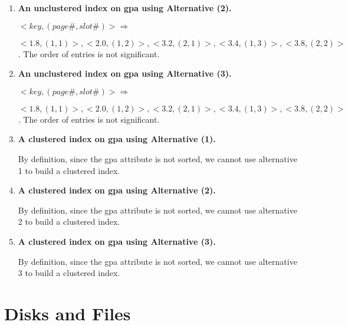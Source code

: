 \begin{enumerate}
\item {\bf An unclustered index on gpa using Alternative (2). }

$<key, (page \#, slot \#)> \Rightarrow$

$<1.8, (1, 1)>, <2.0, (1, 2)>, <3.2, (2, 1)>, <3.4, (1, 3)>, <3.8, (2, 2)>$. The order of entries is not significant.

\item {\bf An unclustered index on gpa using Alternative (3). }

$<key, (page \#, slot \#)> \Rightarrow$

$<1.8, (1, 1)>, <2.0, (1, 2)>, <3.2, (2, 1)>, <3.4, (1, 3)>, <3.8, (2, 2)>$. The order of entries is not significant.

\item {\bf A clustered index on gpa using Alternative (1). }

By definition, since the gpa attribute is not sorted, we cannot use alternative 1 to build a clustered index.

\item {\bf A clustered index on gpa using Alternative (2). }

By definition, since the gpa attribute is not sorted, we cannot use alternative 2 to build a clustered index.

\item {\bf A clustered index on gpa using Alternative (3).}

By definition, since the gpa attribute is not sorted, we cannot use alternative 3 to build a clustered index.

\end{enumerate}

\section{Disks and Files}
